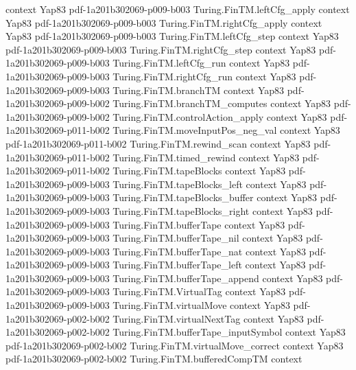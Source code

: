 \begin{theorem}
  {context}
  {Yap83}
  {pdf-1a201b302069-p009-b003}
\proofstep
  {Turing.FinTM.leftCfg_apply}
  {context}
  {Yap83}
  {pdf-1a201b302069-p009-b003}
\proofstep
  {Turing.FinTM.rightCfg_apply}
  {context}
  {Yap83}
  {pdf-1a201b302069-p009-b003}
\proofstep
  {Turing.FinTM.leftCfg_step}
  {context}
  {Yap83}
  {pdf-1a201b302069-p009-b003}
\proofstep
  {Turing.FinTM.rightCfg_step}
  {context}
  {Yap83}
  {pdf-1a201b302069-p009-b003}
\proofstep
  {Turing.FinTM.leftCfg_run}
  {context}
  {Yap83}
  {pdf-1a201b302069-p009-b003}
\proofstep
  {Turing.FinTM.rightCfg_run}
  {context}
  {Yap83}
  {pdf-1a201b302069-p009-b003}
\proofstep
  {Turing.FinTM.branchTM}
  {context}
  {Yap83}
  {pdf-1a201b302069-p009-b002}
\proofstep
  {Turing.FinTM.branchTM_computes}
  {context}
  {Yap83}
  {pdf-1a201b302069-p009-b002}
\proofstep
  {Turing.FinTM.controlAction_apply}
  {context}
  {Yap83}
  {pdf-1a201b302069-p011-b002}
\proofstep
  {Turing.FinTM.moveInputPos_neg_val}
  {context}
  {Yap83}
  {pdf-1a201b302069-p011-b002}
\proofstep
  {Turing.FinTM.rewind_scan}
  {context}
  {Yap83}
  {pdf-1a201b302069-p011-b002}
\proofstep
  {Turing.FinTM.timed_rewind}
  {context}
  {Yap83}
  {pdf-1a201b302069-p011-b002}
\proofstep
  {Turing.FinTM.tapeBlocks}
  {context}
  {Yap83}
  {pdf-1a201b302069-p009-b003}
\proofstep
  {Turing.FinTM.tapeBlocks_left}
  {context}
  {Yap83}
  {pdf-1a201b302069-p009-b003}
\proofstep
  {Turing.FinTM.tapeBlocks_buffer}
  {context}
  {Yap83}
  {pdf-1a201b302069-p009-b003}
\proofstep
  {Turing.FinTM.tapeBlocks_right}
  {context}
  {Yap83}
  {pdf-1a201b302069-p009-b003}
\proofstep
  {Turing.FinTM.bufferTape}
  {context}
  {Yap83}
  {pdf-1a201b302069-p009-b003}
\proofstep
  {Turing.FinTM.bufferTape_nil}
  {context}
  {Yap83}
  {pdf-1a201b302069-p009-b003}
\proofstep
  {Turing.FinTM.bufferTape_nat}
  {context}
  {Yap83}
  {pdf-1a201b302069-p009-b003}
\proofstep
  {Turing.FinTM.bufferTape_left}
  {context}
  {Yap83}
  {pdf-1a201b302069-p009-b003}
\proofstep
  {Turing.FinTM.bufferTape_append}
  {context}
  {Yap83}
  {pdf-1a201b302069-p009-b003}
\proofstep
  {Turing.FinTM.VirtualTag}
  {context}
  {Yap83}
  {pdf-1a201b302069-p009-b003}
\proofstep
  {Turing.FinTM.virtualMove}
  {context}
  {Yap83}
  {pdf-1a201b302069-p002-b002}
\proofstep
  {Turing.FinTM.virtualNextTag}
  {context}
  {Yap83}
  {pdf-1a201b302069-p002-b002}
\proofstep
  {Turing.FinTM.bufferTape_inputSymbol}
  {context}
  {Yap83}
  {pdf-1a201b302069-p002-b002}
\proofstep
  {Turing.FinTM.virtualMove_correct}
  {context}
  {Yap83}
  {pdf-1a201b302069-p002-b002}
\proofstep
  {Turing.FinTM.bufferedCompTM}
  {context}

\end{theorem}
